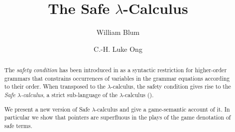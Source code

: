 \documentclass{llncs}
\begin{document}
\frontmatter          %
\pagestyle{headings}  %

\mainmatter              %

\title{The Safe $\lambda$-Calculus}



\author{William Blum \and C.-H. Luke Ong}
%
%



\maketitle              %

\pagestyle{empty}



\begin{abstract}
The \emph{safety condition} has been introduced in \cite{KNU02} as a syntactic
restriction for higher-order grammars that constrains occurrences
of variables in the grammar equations according to their order.
When transposed to the $\lambda$-calculus, the safety condition gives rise to the \emph{Safe $\lambda$-calculus}, a
strict sub-language of the $\lambda$-calculus (\cite{safety-mirlong2004}).

We present a new version of Safe $\lambda$-calculus and give a game-semantic
account of it. In particular we show that pointers are superfluous in the plays
of the game denotation of safe terms.
\end{abstract}
\end{document}
